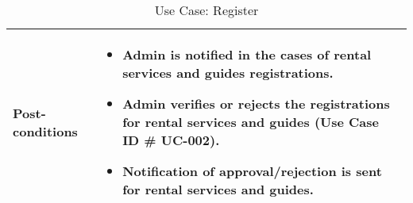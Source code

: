 \begin{table}[!ht]
\begin{tabularx}{\textwidth}{|l|X|}
        \textbf{Post-conditions} & 
        \begin{itemize}[label=--,itemsep=0pt]
            \item Admin is notified in the cases of rental services and guides registrations.
            \item Admin verifies or rejects the registrations for rental services and guides (Use Case ID \# UC-002).
            \item Notification of approval/rejection is sent for rental services and guides.
        \end{itemize} \\
        \hline
    \end{tabularx}
    \label{tab:use-case-register}
    \caption{Use Case: Register}
\end{table}


